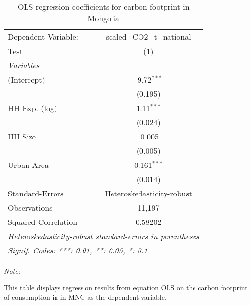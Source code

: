 
\begin{table}[htbp!]
   \centering
   \small
   \begin{adjustbox}{width = 1\textwidth, max height = 0.95\textheight, center}
      \begin{threeparttable}[b]
         \caption{\label{tab:OLS_2_MNG} OLS-regression coefficients for carbon footprint in Mongolia}
         \begin{tabular}{lc}
            \tabularnewline \midrule \midrule
            Dependent Variable: & scaled\_CO2\_t\_national\\     
            Test                & (1)\\  
            \midrule
            \emph{Variables}\\
            (Intercept)         & -9.72$^{***}$\\   
                                & (0.195)\\   
            HH Exp. (log)       & 1.11$^{***}$\\   
                                & (0.024)\\   
            HH Size             & -0.005\\   
                                & (0.005)\\   
            Urban Area          & 0.161$^{***}$\\   
                                & (0.014)\\   
            \midrule 
            Standard-Errors     & Heteroskedasticity-robust \\   
            Observations        & 11,197\\  
            Squared Correlation & 0.58202\\  
            \midrule \midrule
            \multicolumn{2}{l}{\emph{Heteroskedasticity-robust standard-errors in parentheses}}\\
            \multicolumn{2}{l}{\emph{Signif. Codes: ***: 0.01, **: 0.05, *: 0.1}}\\
         \end{tabular}
         
         \begin{tablenotes}\item \medskip \textit{Note:}
            \item This table displays regression results from equation OLS on the carbon footprint of consumption in  in MNG as the dependent variable.  
         \end{tablenotes}
      \end{threeparttable}
   \end{adjustbox}
\end{table}


